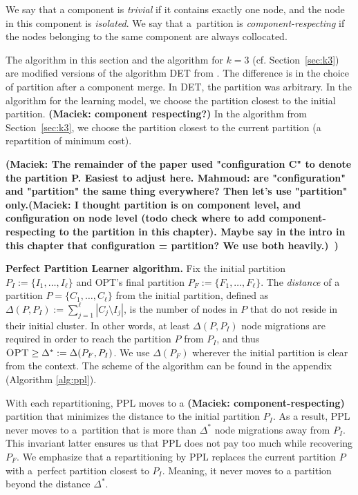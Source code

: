 \documentclass[a4paper,anonymous,USenglish]{lipics-v2019}
\newcommand{\OPT}{\textsc{OPT}\xspace}
\newcommand{\PPL}{\textsc{PPL}\xspace}
\newcommand\mahmoud[1]{\color{orange}\textbf{Mahmoud: #1~}\color{black}}
\newcommand\maciek[1]{\color{brown}\textbf{(Maciek: #1)}\color{black}}
\begin{document}
We say that a component is \emph{trivial} if it contains exactly one node,
and the node in this component is \emph{isolated}.
We say that a~partition is \emph{component-respecting}
if the nodes belonging to the same component are always collocated.

The algorithm in this section and the algorithm for $k=3$ (cf. Section~\ref{sec:k3}) are modified versions of the algorithm DET from \cite{repartition-disc}.
The difference is in the choice of partition after a component merge.
In DET, the partition was arbitrary.
In the algorithm for the learning model, we choose the partition closest to the initial partition.
\maciek{component respecting?}
In the algorithm from Section~\ref{sec:k3}, we choose the partition closest to the current partition (a repartition of minimum cost).



\maciek{The remainder of the paper used "configuration C" to denote the partition P. Easiest to adjust here. \mahmoud{are "configuration" and "partition" the same thing everywhere? Then let's use "partition" only.\maciek{I thought partition is on component level, and configuration on node level (todo check where to add component-respecting to the partition in this chapter). Maybe say in the intro in this chapter that configuration = partition? We use both heavily.}}}

\noindent
\textbf{Perfect Partition Learner algorithm.}
Fix the initial partition
$P_I :=\{ I_1, \dots, I_{\ell}\}$ and \OPT's final partition
$P_F := \{F_1, \dots, F_{\ell}\}$.
The \emph{distance} of a partition
 $P = \{C_1, \dots, C_{\ell}\}$ from the initial partition,
defined as 
$\Delta(P, P_I) := \sum_{j=1}^{\ell} | C_j \setminus I_j |$,
 is the number of nodes in $P$ that do not reside in their initial cluster.
In other words,
at least $\Delta(P, P_I)$ node migrations are required in order to reach the partition $P$ from $P_I$, and thus
$\OPT \geq \Delta^*:= \Delta(P_F, P_I) $.
We  use $ \Delta(P_F) $ wherever the initial partition is clear from the context.
The scheme of the algorithm can be found in the  appendix (Algorithm \ref{alg:ppl}).

With each repartitioning,
\PPL moves to a \maciek{component-respecting} partition that minimizes the distance to the initial partition $P_I$.
As a result,
\PPL never moves to a~partition that is more than $\Delta^*$  node migrations away from $P_I$.
This invariant latter ensures us that \PPL does not pay too much while recovering $P_F$.
We emphasize that a repartitioning by \PPL replaces the current partition $P$ with a~perfect partition closest to $P_I$.
Meaning, it never moves to a partition beyond the distance $\Delta^*$.
\end{document}
